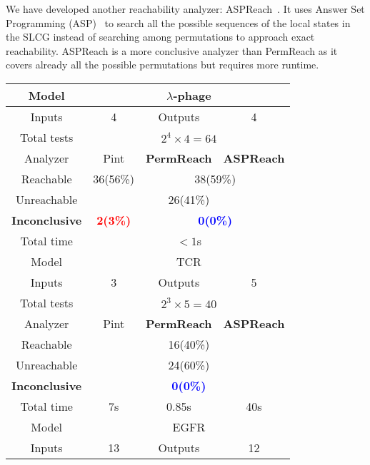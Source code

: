 \documentclass{article}
\theoremstyle{definition}
\begin{document}
We have developed another reachability analyzer: ASPReach~\cite{chai2018reach}. 
It uses Answer Set Programming (ASP)~\cite{baral2003knowledge} to search all the possible sequences of the local states in the SLCG instead of searching among permutations to approach exact reachability.
ASPReach is a more conclusive analyzer than PermReach as it covers already all the possible permutations but requires more runtime.

\begin{table}[ht]
\centering
    \begin{tabular}{|c|c|c|c|}
    \hline
     Model    &  \multicolumn{3}{c|}{$\lambda$-phage}\\
     \hline
     Inputs    & 4 & Outputs& 4\\%
     \hline
     Total tests&\multicolumn{3}{c|}{$2^4\times 4=64$}\\
     \hline
     Analyzer  &  Pint  &  \textbf{PermReach}   &\textbf{ASPReach}\\
     \hline
     Reachable & 36(56\%)& \multicolumn{2}{c|}{38(59\%)} \\
     \hline
     Unreachable&\multicolumn{3}{c|}{26(41\%)}\\
     \hline
     \textbf{Inconclusive} &\textcolor{red}{\textbf{2(3\%)}}&\multicolumn{2}{c|}{\textcolor{blue}{\textbf{0(0\%)}}}\\
     \hline
     Total time & \multicolumn{3}{c|}{$<1$s}\\
    \hline
     Model    &  \multicolumn{3}{c|}{TCR}\\
     \hline
     Inputs    & 3 & Outputs& 5\\
     \hline
     Total tests&\multicolumn{3}{c|}{$2^3\times 5=40$}\\
     \hline
     Analyzer  &  Pint  &  \textbf{PermReach}   &\textbf{ASPReach}\\
     \hline
     Reachable & \multicolumn{3}{c|}{16(40\%)} \\
     \hline
     Unreachable&\multicolumn{3}{c|}{24(60\%)} \\
     \hline
     \textbf{Inconclusive} &\multicolumn{3}{c|}{\textcolor{blue}{\textbf{0(0\%)}}} \\
     \hline
     Total time &  7s     &0.85s  &  40s        \\
    \hline
     Model    &  \multicolumn{3}{c|}{EGFR}\\
     \hline
     Inputs    & 13 & Outputs& 12\\

\end{tabular}
\end{table}
\end{document}
